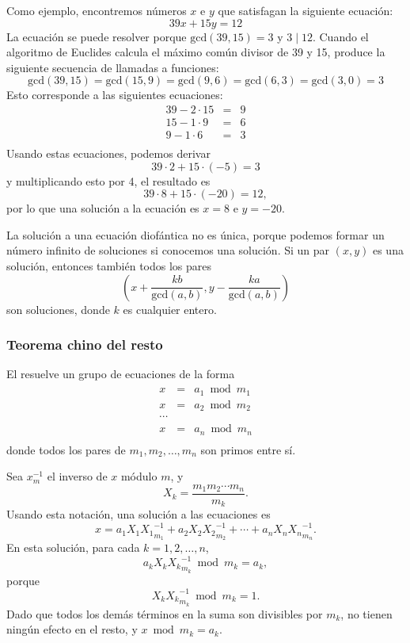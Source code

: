 Como ejemplo, encontremos números $x$ e $y$
que satisfagan la siguiente ecuación:
\[
39x + 15y = 12
\]
La ecuación se puede resolver porque
$\textrm{gcd}(39,15)=3$ y $3 \mid 12$.
Cuando el algoritmo de Euclides calcula el
máximo común divisor de 39 y 15,
produce la siguiente secuencia de llamadas a funciones:
\[
\textrm{gcd}(39,15) = \textrm{gcd}(15,9)
= \textrm{gcd}(9,6) = \textrm{gcd}(6,3)
= \textrm{gcd}(3,0) = 3 \]
Esto corresponde a las siguientes ecuaciones:
\[
\begin{array}{lcl}
39 - 2 \cdot 15 & = & 9 \\
15 - 1 \cdot 9 & = & 6 \\
9 - 1 \cdot 6 & = & 3 \\
\end{array}
\]
Usando estas ecuaciones, podemos derivar
\[
39 \cdot 2 + 15 \cdot (-5) = 3
\]
y multiplicando esto por 4, el resultado es
\[
39 \cdot 8 + 15 \cdot (-20) = 12,
\]
por lo que una solución a la ecuación es
$x=8$ e $y=-20$.

La solución a una ecuación diofántica no es única,
porque podemos formar un número infinito de soluciones
si conocemos una solución.
Si un par $(x,y)$ es una solución, entonces también todos los pares
\[(x+\frac{kb}{\textrm{gcd}(a,b)},y-\frac{ka}{\textrm{gcd}(a,b)})\]
son soluciones, donde $k$ es cualquier entero.

\subsubsection{Teorema chino del resto}


El  resuelve
un grupo de ecuaciones de la forma
\[
\begin{array}{lcl}
x & = & a_1 \bmod m_1 \\
x & = & a_2 \bmod m_2 \\
\cdots \\
x & = & a_n \bmod m_n \\
\end{array}
\]
donde todos los pares de $m_1,m_2,\ldots,m_n$ son primos entre sí.

Sea $x^{-1}_m$ el inverso de $x$ módulo $m$, y
\[ X_k = \frac{m_1 m_2 \cdots m_n}{m_k}.\]
Usando esta notación, una solución a las ecuaciones es
\[x = a_1 X_1 {X_1}^{-1}_{m_1} + a_2 X_2 {X_2}^{-1}_{m_2} + \cdots + a_n X_n {X_n}^{-1}_{m_n}.\]
En esta solución, para cada $k=1,2,\ldots,n$,
\[a_k X_k {X_k}^{-1}_{m_k} \bmod m_k = a_k,\]
porque
\[X_k {X_k}^{-1}_{m_k} \bmod m_k = 1.\]
Dado que todos los demás términos en la suma son divisibles por $m_k$,
no tienen ningún efecto en el resto,
y $x \bmod m_k = a_k$.

